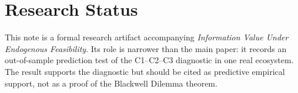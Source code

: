 \documentclass[12pt]{article}
\begin{document}
\section{Research Status}

This note is a formal research artifact accompanying \emph{Information Value Under Endogenous Feasibility}. Its role is narrower than the main paper: it records an out-of-sample prediction test of the C1--C2--C3 diagnostic in one real ecosystem. The result supports the diagnostic but should be cited as predictive empirical support, not as a proof of the Blackwell Dilemma theorem.
\end{document}
